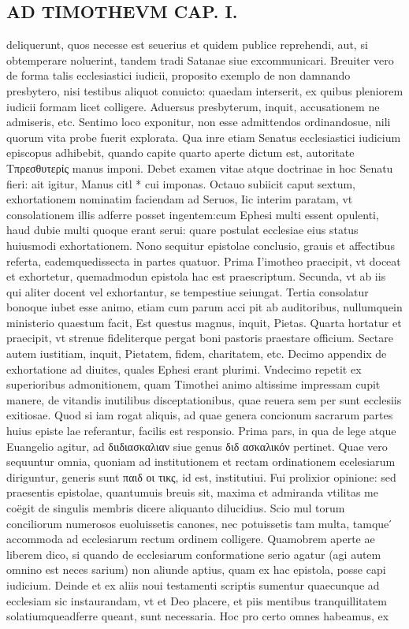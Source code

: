 \documentclass{article}
\begin{document}
\begin{pages}
\section*{AD TIMOTHEVM CAP. I. }
\marginpar{[ p.3 ]}\pstart deliquerunt, quos necesse est seuerius et quidem publice reprehendi, aut, si obtemperare noluerint, tandem tradi Satanae siue excommunicari. Breuiter vero de forma talis ecclesiastici iudicii, proposito exemplo de non damnando presbytero, nisi testibus aliquot conuicto: quaedam interserit, ex quibus pleniorem iudicii formam licet colligere. Aduersus presbyterum, inquit, accusationem ne admiseris, etc.  \pend\pstart Sentimo loco exponitur, non esse admittendos ordinandosue, nili quorum vita probe fuerit explorata. Qua inre etiam Senatus ecclesiastici iudicium episcopus adhibebit, quando capite quarto aperte dictum est, autoritate Τπρεσθυτερίς manus imponi. Debet examen vitae atque  doctrinae in hoc Senatu fieri: ait igitur, Manus citl * cui imponas.  \pend\pstart Octauo subiicit caput sextum, exhortationem nominatim faciendam ad Seruos, Iic interim paratam, vt consolationem illis adferre posset ingentem:cum Ephesi multi essent opulenti, haud dubie multi quoque  erant serui: quare postulat ecclesiae eius status huiusmodi exhortationem.  \pend\pstart Nono sequitur epistolae conclusio, grauis et affectibus referta, eademquedissecta in partes quatuor. Prima I’imotheo praecipit, vt doceat et exhortetur, quemadmodun epistola hac est praescriptum. Secunda, vt ab iis qui aliter docent vel exhortantur, se tempestiue seiungat. Tertia consolatur bonoque  iubet esse animo, etiam cum parum acci pit ab auditoribus, nullumquein ministerio quaestum facit, Est questus magnus, inquit, Pietas. Quarta hortatur et praecipit, vt strenue fideliterque  pergat boni pastoris praestare officium. Sectare autem iustitiam, inquit, Pietatem, fidem, charitatem, etc.  \pend\pstart Decimo appendix de exhortatione ad diuites, quales Ephesi erant plurimi. Vndecimo repetit ex superioribus admonitionem, quam Timothei animo altissime impressam cupit manere, de vitandis inutilibus disceptationibus, quae reuera sem per sunt ecclesiis exitiosae.  \pend\pstart Quod si iam rogat aliquis, ad quae genera concionum sacrarum partes huius episte lae referantur, facilis est responsio. Prima pars, in qua de lege atque  Euangelio agitur, ad διιδιασκαλιαν siue genus διδ ασκαλικόν pertinet. Quae vero sequuntur omnia, quoniam ad institutionem et rectam ordinationem ecelesiarum diriguntur, generis sunt παιδ οι τικς, id est, institutiui.  \pend\pstart Fui prolixior opinione: sed praesentis epistolae, quantumuis breuis sit, maxima et admiranda vtilitas me coëgit de singulis membris dicere aliquanto dilucidius. Scio mul torum conciliorum numerosos euoluissetis canones, nec potuissetis tam multa, tamque ́ accommoda ad ecclesiarum rectum ordinem colligere. Quamobrem aperte ae liberem dico, si quando de ecclesiarum conformatione serio agatur (agi autem omnino est neces sarium) non aliunde aptius, quam ex hac epistola, posse capi iudicium. Deinde et ex aliis noui testamenti scriptis sumentur quaecunque  ad ecclesiam sic instaurandam, vt et Deo placere, et piis mentibus tranquillitatem solatiumqueadferre queant, sunt necessaria. Hoc pro certo omnes habeamus, ex 
\end{pages}
\end{document}
